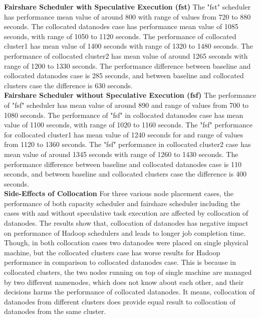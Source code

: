 \textbf{Fairshare Scheduler with Speculative Execution (fst)} The "fst" scheduler has performance mean value of around 800 with range of values from 720 to 880 seconds. The collocated datanodes case has performance mean value of 1085 seconds, with range of 1050 to 1120 seconds. The performance of collocated cluster1 has mean value of 1400 seconds with range of 1320 to 1480 seconds. The performance of collocated cluster2 has mean value of around 1265 seconds with range of 1200 to 1330 seconds. The performance difference between baseline and collocated datanodes case is 285 seconds, and between baseline and collocated clusters case the difference is 630 seconds.\\ 

\textbf{Fairshare Scheduler without Speculative Execution (fsf) } The performance of "fsf" scheduler  has mean value of around 890 and range of values from 700 to 1080 seconds. The performance of "fsf" in collocated datanodes case has mean value of 1100 seconds, with range of 1020 to 1160 seconds. The "fsf" performance for collocated cluster1 has mean value of 1240 seconds for and range of values from 1120 to 1360 seconds. The "fsf" performance in collocated cluster2 case has mean value of around 1345 seconds with range of 1260 to 1430 seconds. The performance difference between baseline and collocated datanodes  case is 110 seconds, and between baseline and collocated clusters case the difference is 400 seconds.\\


\textbf{Side-Effects of Collocation} For three various node placement cases, the performance of both capacity scheduler and fairshare scheduler including the cases with and without speculative task execution are affected by collocation of datanodes. The results show that, collocation of datanodes has negative impact on performance of Hadoop schedulers and leads to longer job completion time. Though, in both collocation cases two datanodes were placed on single physical machine, but the collocated clusters case has worse results for Hadoop performance in comparison to collocated datanodes case. This is because in collocated clusters, the two nodes running on top of single machine are managed by two different namenodes, which does not know about each other, and their decisions harms the performance of collocated datanodes. It means, collocation of datanodes from different clusters does provide equal result to collocation of datanodes from the same cluster. \\  

